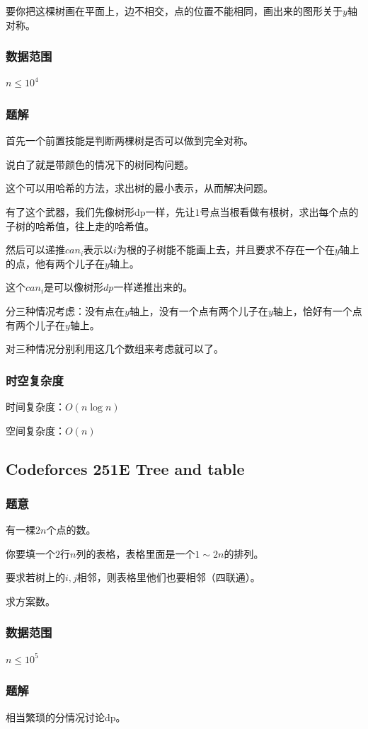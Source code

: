 \documentclass{ctexart}
\begin{document}
要你把这棵树画在平面上，边不相交，点的位置不能相同，画出来的图形关于$y$轴对称。
\subsubsection{数据范围}
$n \le 10^4$
\subsubsection{题解}
首先一个前置技能是判断两棵树是否可以做到完全对称。

说白了就是带颜色的情况下的树同构问题。

这个可以用哈希的方法，求出树的最小表示，从而解决问题。

有了这个武器，我们先像树形dp一样，先让$1$号点当根看做有根树，求出每个点的子树的哈希值，往上走的哈希值。

然后可以递推$can_i$表示以$i$为根的子树能不能画上去，并且要求不存在一个在$y$轴上的点，他有两个儿子在$y$轴上。

这个$can_i$是可以像树形$dp$一样递推出来的。

分三种情况考虑：没有点在$y$轴上，没有一个点有两个儿子在$y$轴上，恰好有一个点有两个儿子在$y$轴上。

对三种情况分别利用这几个数组来考虑就可以了。
\subsubsection{时空复杂度}
时间复杂度：$O(n \log n)$

空间复杂度：$O(n)$
\subsection{Codeforces 251E Tree and table}
\subsubsection{题意}
有一棵$2n$个点的数。

你要填一个$2$行$n$列的表格，表格里面是一个$1 \sim 2n$的排列。

要求若树上的$i,j$相邻，则表格里他们也要相邻（四联通）。

求方案数。
\subsubsection{数据范围}
$n \le 10^5$
\subsubsection{题解}
相当繁琐的分情况讨论dp。
\end{document}
